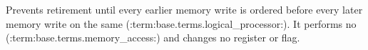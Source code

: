Prevents retirement until every earlier memory write is ordered before every later memory write on the same (:term:base.terms.logical_processor:). It performs no (:term:base.terms.memory_access:) and changes no register or flag.

